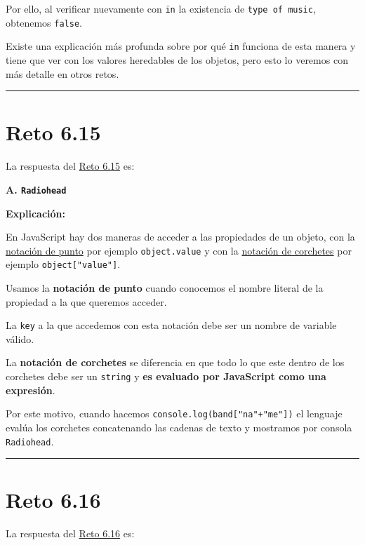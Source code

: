 \documentclass[
  letterpaper,
  DIV=11,
  numbers=noendperiod]{scrreprt}
\begin{document}
Por ello, al verificar nuevamente con \texttt{in} la existencia de
\texttt{type\ of\ music}, obtenemos \texttt{false}.

Existe una explicación más profunda sobre por qué \texttt{in} funciona
de esta manera y tiene que ver con los valores heredables de los
objetos, pero esto lo veremos con más detalle en otros retos.

\begin{center}\rule{0.5\linewidth}{0.5pt}\end{center}

\section{Reto 6.15}\label{sec-sol-cap6-reto15}

La respuesta del \hyperref[sec-cap6-reto15]{Reto 6.15} es:

\textbf{A. \texttt{Radiohead}}

\textbf{Explicación:}

En JavaScript hay dos maneras de acceder a las propiedades de un objeto,
con la \hyperref[glos-dot-notation]{notación de punto} por ejemplo
\texttt{object.value} y con la
\hyperref[glos-notacion_corchetes]{notación de corchetes} por ejemplo
\texttt{object{[}"value"{]}}.

Usamos la \textbf{notación de punto} cuando conocemos el nombre literal
de la propiedad a la que queremos acceder.

La \texttt{key} a la que accedemos con esta notación debe ser un nombre
de variable válido.

La \textbf{notación de corchetes} se diferencia en que todo lo que este
dentro de los corchetes debe ser un \texttt{string} y \textbf{es
evaluado por JavaScript como una expresión}.

Por este motivo, cuando hacemos
\texttt{console.log(band{[}"na"+"me"{]})} el lenguaje evalúa los
corchetes concatenando las cadenas de texto y mostramos por consola
\texttt{Radiohead}.

\begin{center}\rule{0.5\linewidth}{0.5pt}\end{center}

\section{Reto 6.16}\label{sec-sol-cap6-reto16}

La respuesta del \hyperref[sec-cap6-reto16]{Reto 6.16} es:
\end{document}
